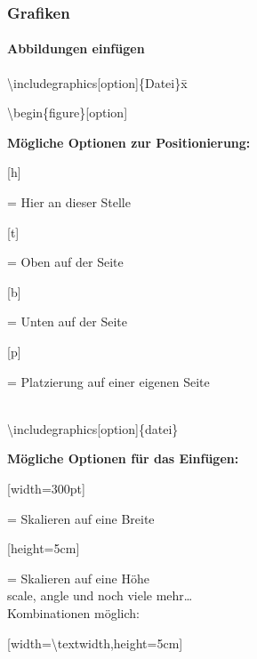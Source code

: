 \begin{frame}
\frametitle{Grafiken}
\framesubtitle{Abbildungen einfügen}
\begin{tabbing}
\textbackslash includegraphics[option]\{Datei\}x\=\kill
\hspace{-10mm}
\begin{ttfamily}
\color{unibablueI}\textbackslash begin\color{black}\{figure\}\color{nounibagreenI}[option]\color{black}
\end{ttfamily}
\>\textbf{Mögliche Optionen zur Positionierung:}\\
\>\begin{ttfamily}\color{nounibagreenI}[h]\color{black}\end{ttfamily} = Hier an dieser Stelle\\
\>\begin{ttfamily}\color{nounibagreenI}[t]\color{black}\end{ttfamily} = Oben auf der Seite\\
\>\begin{ttfamily}\color{nounibagreenI}[b]\color{black}\end{ttfamily} = Unten auf der Seite\\
\>\begin{ttfamily}\color{nounibagreenI}[p]\color{black}\end{ttfamily} = Platzierung auf einer eigenen
Seite\\[5mm]
~\\[5mm]
\hspace{-10mm}
\begin{ttfamily}
\small\color{nounibaredI}\textbackslash includegraphics\color{nounibagreenI}[option]\color{black}\{datei\}
\end{ttfamily}
\>\textbf{Mögliche Optionen für das Einfügen:}\\
\>\begin{ttfamily}\color{nounibagreenI}[width=300pt]\color{black}\end{ttfamily} = Skalieren auf eine Breite\\
\>\begin{ttfamily}\color{nounibagreenI}[height=5cm]\color{black}\end{ttfamily} = Skalieren auf eine Höhe\\
\>scale, angle und noch viele mehr\ldots\\
\>Kombinationen möglich:\\
\>\begin{ttfamily}\color{nounibagreenI}[width=\textbackslash textwidth,height=5cm]\color{black}\end{ttfamily}
\end{tabbing}
\end{frame}

